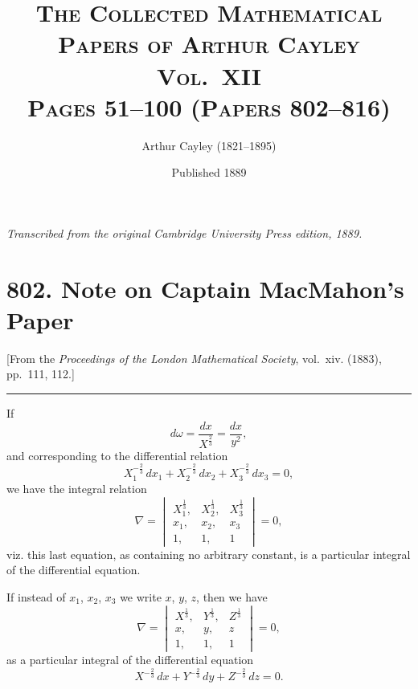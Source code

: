 \documentclass[11pt,a4paper]{article}
\theoremstyle{plain}
\theoremstyle{definition}
\theoremstyle{remark}
\begin{document}
\title{\scshape The Collected Mathematical Papers of Arthur Cayley\\Vol.\ XII\\[0.5em]\large Pages 51--100 (Papers 802--816)}
\author{Arthur Cayley (1821--1895)}
\date{Published 1889}
\maketitle

\thispagestyle{empty}
\begin{center}
\textit{Transcribed from the original Cambridge University Press edition, 1889.}
\end{center}

\tableofcontents
\newpage

\section*{802. Note on Captain MacMahon's Paper}

\begin{center}
\small[From the \textit{Proceedings of the London Mathematical Society}, vol.~xiv. (1883),\\
pp.~111, 112.]
\end{center}

\bigskip

\begin{center}
\rule{0.5\textwidth}{0.4pt}
\end{center}

\noindent
If
\[
d\omega = \frac{dx}{X^{\frac{2}{3}}} = \frac{dx}{y^{2}},
\]
and corresponding to the differential relation
\[
X_1^{-\frac{2}{3}}\,dx_1 + X_2^{-\frac{2}{3}}\,dx_2 + X_3^{-\frac{2}{3}}\,dx_3 = 0,
\]
we have the integral relation
\[
\nabla = \begin{vmatrix}
X_1^{\frac{1}{3}}, & X_2^{\frac{1}{3}}, & X_3^{\frac{1}{3}} \\
x_1, & x_2, & x_3 \\
1, & 1, & 1
\end{vmatrix} = 0,
\]
viz. this last equation, as containing no arbitrary constant, is a particular integral of the differential equation.

If instead of $x_1$, $x_2$, $x_3$ we write $x$, $y$, $z$, then we have
\[
\nabla = \begin{vmatrix}
X^{\frac{1}{3}}, & Y^{\frac{1}{3}}, & Z^{\frac{1}{3}} \\
x, & y, & z \\
1, & 1, & 1
\end{vmatrix} = 0,
\]
as a particular integral of the differential equation
\[
X^{-\frac{2}{3}}\,dx + Y^{-\frac{2}{3}}\,dy + Z^{-\frac{2}{3}}\,dz = 0.
\]
\end{document}
